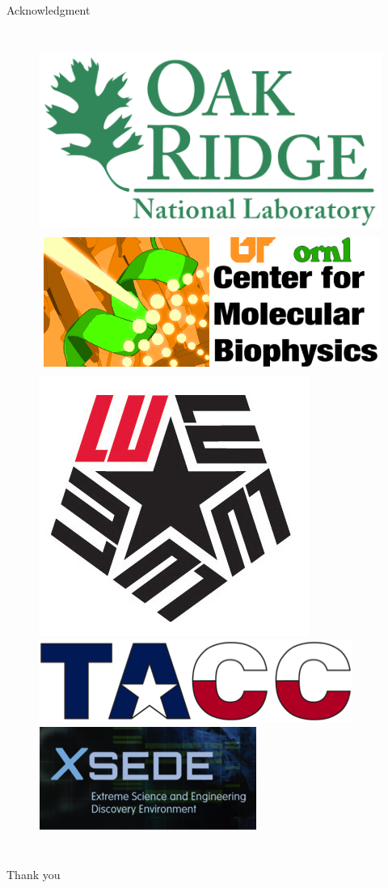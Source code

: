 \documentclass{beamer}
\begin{document}
\begin{frame}{Acknowledgment}
\begin{columns}
	\begin{figure} 
		\includegraphics[width=.8\columnwidth]{Pics/ORNL.png} \\ 
		\includegraphics[width=.8\columnwidth]{Pics/cmb_logo.png} \\
		\includegraphics[width=.5\columnwidth]{Pics/LU.jpg} \\
		\includegraphics[width=.8\columnwidth]{Pics/TACC.png} \\
		\includegraphics[width=.8\columnwidth]{Pics/XSEDE.png}
		
	\end{figure}
	
\end{columns}

\end{frame}

\begin{frame}
 \centering 
 {\Large Thank you}
\end{frame}
\end{document}
